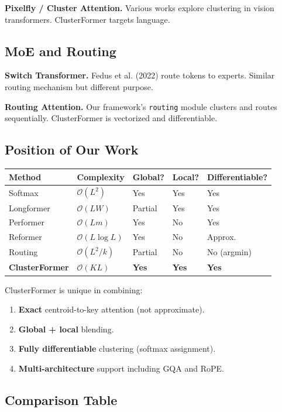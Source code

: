 \textbf{Pixelfly / Cluster Attention.} Various works explore clustering in vision 
transformers. ClusterFormer targets language.

\subsection{MoE and Routing}

\textbf{Switch Transformer.} Fedus et al. (2022) route tokens to experts. Similar 
routing mechanism but different purpose.

\textbf{Routing Attention.} Our framework's \texttt{routing} module clusters and routes 
sequentially. ClusterFormer is vectorized and differentiable.

\subsection{Position of Our Work}

\begin{table}[H]
\centering
\small
\begin{tabular}{lllll}
\toprule
\textbf{Method} & \textbf{Complexity} & \textbf{Global?} & \textbf{Local?} & \textbf{Differentiable?} \\
\midrule
Softmax & $\mathcal{O}(L^2)$ & Yes & Yes & Yes \\
Longformer & $\mathcal{O}(LW)$ & Partial & Yes & Yes \\
Performer & $\mathcal{O}(Lm)$ & Yes & No & Yes \\
Reformer & $\mathcal{O}(L\log L)$ & Yes & No & Approx. \\
Routing & $\mathcal{O}(L^2/k)$ & Partial & No & No (argmin) \\
\textbf{ClusterFormer} & $\mathcal{O}(KL)$ & \textbf{Yes} & \textbf{Yes} & \textbf{Yes} \\
\bottomrule
\end{tabular}
\end{table}

ClusterFormer is unique in combining:
\begin{enumerate}
\item \textbf{Exact} centroid-to-key attention (not approximate).
\item \textbf{Global + local} blending.
\item \textbf{Fully differentiable} clustering (softmax assignment).
\item \textbf{Multi-architecture} support including GQA and RoPE.

\end{enumerate}
\subsection{Comparison Table}
